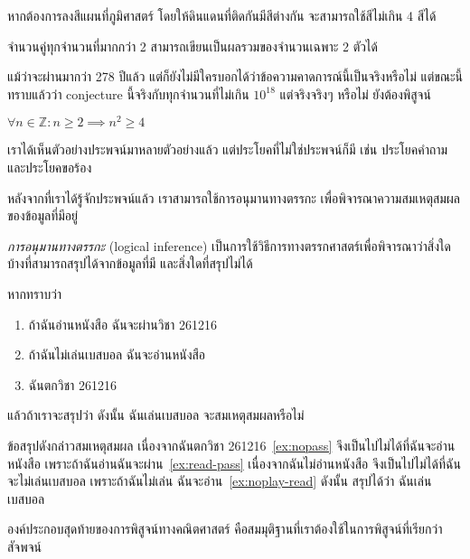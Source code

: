 \begin{theorem}
หากต้องการลงสีแผนที่ภูมิศาสตร์ โดยให้ดินแดนที่ติดกันมีสีต่างกัน จะสามารถใช้สีไม่เกิน 4 สีได้
\end{theorem}

\begin{conjecture}[Goldbach, 1742]
จำนวนคู่ทุกจำนวนที่มากกว่า 2 สามารถเขียนเป็นผลรวมของจำนวนเฉพาะ 2 ตัวได้
\end{conjecture}
แม้ว่าจะผ่านมากว่า 278 ปีแล้ว แต่ก็ยังไม่มีใครบอกได้ว่าข้อความคาดการณ์นี้เป็นจริงหรือไม่ แต่ขณะนี้ทราบแล้วว่า conjecture นี้จริงกับทุกจำนวนที่ไม่เกิน $10^{18}$ แต่จริงจริงๆ หรือไม่ ยังต้องพิสูจน์

\begin{example}
$\forall n\in\mathbb{Z}: n\geq 2\implies n^2\geq 4$
\end{example}

เราได้เห็นตัวอย่างประพจน์มาหลายตัวอย่างแล้ว แต่ประโยคที่ไม่ใช่ประพจน์ก็มี เช่น ประโยคคำถาม และประโยคขอร้อง

หลังจากที่เราได้รู้จักประพจน์แล้ว เราสามารถใช้การอนุมานทางตรรกะ เพื่อพิจารณาความสมเหตุสมผลของข้อมูลที่มีอยู่

\begin{definition}
\emph{การอนุมานทางตรรกะ} (logical inference) เป็นการใช้วิธีการทางตรรกศาสตร์เพื่อพิจารณาว่าสิ่งใดบ้างที่สามารถสรุปได้จากข้อมูลที่มี และสิ่งใดที่สรุปไม่ได้
\end{definition}
%
\begin{example}\label{ex:baseball-reasoning}
หากทราบว่า
\begin{enumerate}[ref=(\arabic*)]
\item\label{ex:read-pass} ถ้าฉันอ่านหนังสือ ฉันจะผ่านวิชา 261216
\item\label{ex:noplay-read} ถ้าฉันไม่เล่นเบสบอล ฉันจะอ่านหนังสือ
\item\label{ex:nopass} ฉันตกวิชา 261216
\end{enumerate}
แล้วถ้าเราจะสรุปว่า ดังนั้น ฉันเล่นเบสบอล จะสมเหตุสมผลหรือไม่
\begin{pf}
ข้อสรุปดังกล่าวสมเหตุสมผล เนื่องจากฉันตกวิชา 261216~\ref{ex:nopass} จึงเป็นไปไม่ได้ที่ฉันจะอ่านหนังสือ เพราะถ้าฉันอ่านฉันจะผ่าน~\ref{ex:read-pass} \enskip เนื่องจากฉันไม่อ่านหนังสือ จึงเป็นไปไม่ได้ที่ฉันจะไม่เล่นเบสบอล เพราะถ้าฉันไม่เล่น ฉันจะอ่าน~\ref{ex:noplay-read} \enskip ดังนั้น สรุปได้ว่า ฉันเล่นเบสบอล
\end{pf}
\end{example}

องค์ประกอบสุดท้ายของการพิสูจน์ทางคณิตศาสตร์ คือสมมุติฐานที่เราต้องใช้ในการพิสูจน์ที่เรียกว่าสัจพจน์

